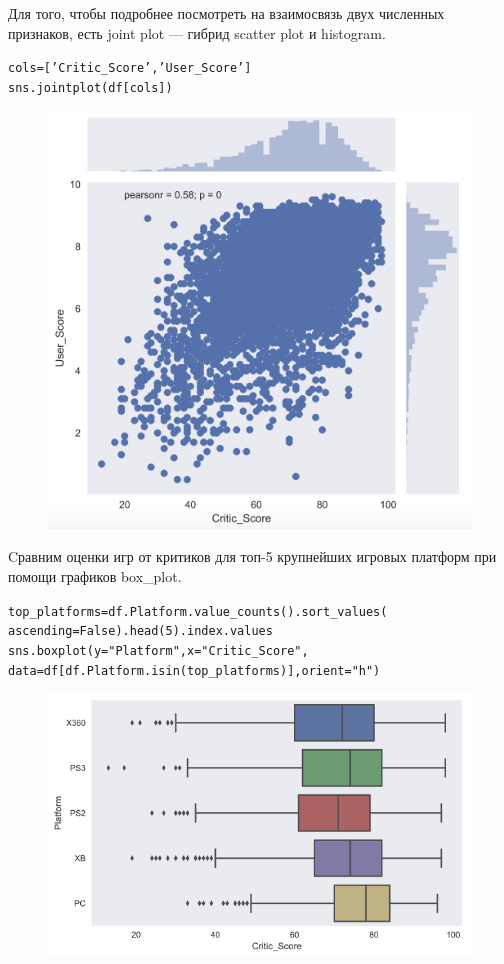 \documentclass{beamer}
\begin{document}
\begin{frame}[fragile]
Для того, чтобы подробнее посмотреть на взаимосвязь двух численных признаков, есть joint plot — гибрид scatter plot и histogram.
\begin{alltt}
cols = ['Critic_Score', 'User_Score']
sns.jointplot(df[cols])
\end{alltt}
\begin{figure}[h]
\centering
\includegraphics[scale=0.35]{images/seaborn-06.png}
\end{figure}
\end{frame}

\begin{frame}[fragile]
Cравним оценки игр от критиков для топ-5 крупнейших игровых платформ при помощи графиков box\_plot.
\begin{alltt}
top\_platforms = df.Platform.value_counts().sort\_values(
    ascending = False).head(5).index.values
sns.boxplot(y="Platform", x="Critic\_Score", 
    data=df[df.Platform.isin(top\_platforms)], orient="h")
\end{alltt}
\begin{figure}[h]
\centering
\includegraphics[scale=0.35]{images/seaborn-07.png}
\end{figure}
\end{frame}
\end{document}
